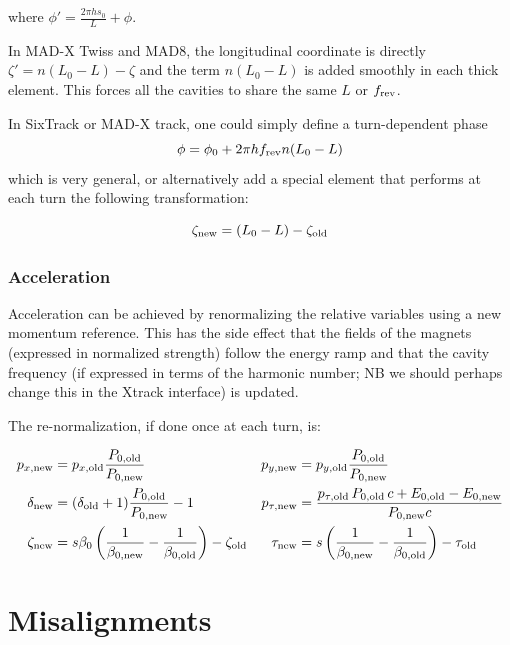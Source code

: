 where $\phi'=\frac{2\pi h s_0}{L} + \phi$.


In MAD-X Twiss and MAD8, the longitudinal coordinate is directly $\zeta'=n(L_0-L) -\zeta$ and the term $n(L_0-L)$ is added smoothly in each thick element. This forces all the cavities to share the same $L$ or $f_{\rm rev}$.

In SixTrack or MAD-X track, one could simply define a turn-dependent phase
\begin{equation}
\phi=\phi_0 + 2 \pi h f_{\rm rev} n(L_0-L)
\end{equation}
which is very general, or alternatively add a special element that performs at each turn the following transformation:

\begin{equation}
\zeta_{\rm new}=(L_0-L) -\zeta_{\rm old}
\end{equation}

\subsection{Acceleration}

Acceleration can be achieved by renormalizing the relative variables using a new momentum reference. This has the side effect that the fields of the magnets (expressed in normalized strength) follow the energy ramp and that the cavity frequency (if expressed in terms of the harmonic number; NB we should perhaps change this in the Xtrack interface) is updated.

The re-normalization, if done once at each turn, is:

\begin{align}
p_{x,\rm new} &= p_{x,\rm old} \frac{P_{0,\rm old}}{P_{0,\rm new}} &
p_{y,\rm new} &= p_{y,\rm old} \frac{P_{0,\rm old}}{P_{0,\rm new}} \\
\delta_{\rm new}&= (\delta_{\rm old}+1) \frac{P_{0,\rm old}}{P_{0,\rm new}} -1 &
p_{\tau,\rm new} &= \frac{p_{\tau,\rm old}\, P_{0,\rm old}\,c + E_{0,\rm old} - E_{0,\rm new}}{P_{0,\rm new}c} \\
\zeta_{\rm new} &= s\beta_0 \left(\frac{1}{\beta_{0,\rm new}} -
\frac{1}{\beta_{0,\rm old}}\right) - \zeta_{\rm old} &
\tau_{\rm new} &= s\left(\frac{1}{\beta_{0,\rm new}} -  \frac{1}{\beta_{0,\rm old}}\right) - \tau_{\rm old} \\
\end{align}


\chapter{Misalignments}\label{chapter:misalignments}

